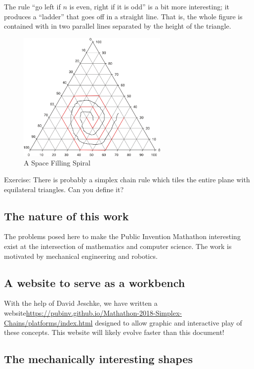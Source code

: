 \documentclass[11pt]{article}
\begin{document}
The rule ``go left if $n$ is even, right if it is odd'' is a bit more interesting; it produces a ``ladder'' that goes off
in a straight line. That is, the whole figure is contained with in two parallel lines separated by the height of the triangle.

\begin{figure}
     \centering
     \includegraphics[width=0.65\textwidth]{figures/2DSpaceFilling.png}
     \caption{A Space Filling Spiral}
  \label{fig:equitetrabeam}
\end{figure}


Exercise: There is probably a simplex chain rule which tiles the entire plane with equilateral triangles. Can you define it?

\subsection{The nature of this work}

The problems posed here to make the Public Invention Mathathon interesting exist at the intersection of mathematics and
computer science. The work is motivated by mechanical engineering and robotics.

\subsection{A website to serve as a workbench}

With the help of David Jeschke, we have written a website\url{https://pubinv.github.io/Mathathon-2018-Simplex-Chains/platforms/index.html}
designed to allow graphic and interactive play of these concepts.  This website will likely evolve faster than this document!

\subsection{The mechanically interesting shapes}
\end{document}

